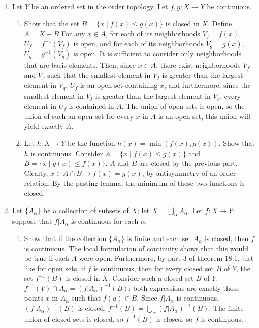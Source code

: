 \documentclass[12pt,letterpaper]{article}
\newcommand{\n}{\break}
\begin{document}
\begin{enumerate}
\begin{enumerate}
  \end{enumerate}
  \item Let $Y$ be an ordered set in the order topology. Let $f,g: X\rightarrow Y$ be continuous.
  \begin{enumerate}
    \item Show that the set $B=\{x\;|\; f(x)\leq g(x)\}$ is closed in $X$.\hspace{5in}\n
    \indent Define $A=X-B$ For any $x\in A$, for each of its neighborhoods $V_f=f(x)$, $U_f=f^{-1}(V_f)$ is open, and for each of its neighborhoods $V_g=g(x)$, $U_g=g^{-1}(V_g)$ is open. It is sufficient to consider only neighborhoods that are basis elements. Then, since $x\in A$, there exist neighborhoods $V_f$ and $V_g$ such that the smallest element in $V_f$ is greater than the largest element in $V_g$. $U_f$ is an open set containing $x$, and furthermore, since the smallest element in $V_f$ is greater than the largest element in $V_g$, every element in $U_f$ is contained in $A$. The union of open sets is open, so the union of such an open set for every $x$ in $A$ is an open set, this union will yield exactly $A$.
    \item Let $h: X\rightarrow Y$ be the function $h(x)=\min(f(x),g(x))$. Show that $h$ is continuous.\hspace{5in}\n
    \indent Consider $A=\{x\;|\; f(x)\leq g(x)\}$ and $B=\{x\;|\; g(x)\leq f(x)\}$. $A$ and $B$ are closed by the previous part. Clearly, $x\in A\cap B\rightarrow f(x)=g(x)$, by antisymmetry of an order relation. By the pasting lemma, the minimum of these two functions is closed.
  \end{enumerate}
  \item Let $\{A_\alpha\}$ be a collection of subsets of $X$; let $X=\bigcup_\alpha A_\alpha$. Let $f: X\rightarrow Y$; suppose that $f|A_\alpha$ is continuous for each $\alpha$. 
  \begin{enumerate}
    \item Show that if the collection $\{A_\alpha\}$ is finite and each set $A_\alpha$ is closed, then $f$ is continuous.\hspace{5in}\n
    \indent The local formulation of continuity shows that this would be true if each $A$ were open. Furthermore, by part 3 of theorem 18.1, just like for open sets, if $f$ is continuous, then for every closed set $B$ of $Y$, the set $f^{-1}(B)$ is closed in $X$. Consider such a closed set $B$ of $Y$. $f^{-1}(V)\cap A_\alpha = (f|A_\alpha)^{-1}(B)$: both expressions are exactly those points $x$ in $A_\alpha$ such that $f(a)\in B$. Since $f|A_\alpha$ is continuous, $(f|A_\alpha)^{-1}(B)$ is closed. $f^{-1}(B) = \bigcup_\alpha(f|A_\alpha)^{-1}(B)$. The finite union of closed sets is closed, so $f^{-1}(B)$ is closed, so $f$ is continuous.

\end{enumerate}
\end{enumerate}
\end{document}

